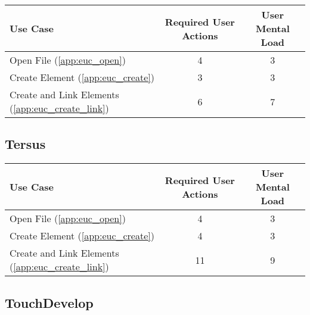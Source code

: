 \begin{tabularx}{\textwidth}{Xcc}
\textbf{Use Case} & \textbf{Required User Actions} & \textbf{User Mental Load}\\
\hline
Open File (\ref{app:euc_open})                       & 4 & 3 \\
Create Element (\ref{app:euc_create})                & 3 & 3 \\
Create and Link Elements (\ref{app:euc_create_link}) & 6 & 7
\end{tabularx}

\subsection*{Tersus}




\begin{tabularx}{\textwidth}{Xcc}
\textbf{Use Case} & \textbf{Required User Actions} & \textbf{User Mental Load}\\
\hline
Open File (\ref{app:euc_open})                       & 4 & 3 \\
Create Element (\ref{app:euc_create})                & 4 & 3 \\
Create and Link Elements (\ref{app:euc_create_link}) & 11 & 9
\end{tabularx}

\subsection*{TouchDevelop}

